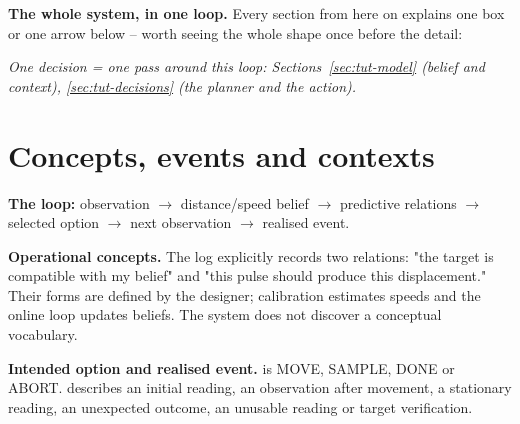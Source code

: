 \documentclass[11pt,a4paper]{article}
\newcommand{\code}[1]{\texttt{\detokenize{#1}}}
\begin{document}
\textbf{The whole system, in one loop.} Every section from here on explains one box or one arrow below -- worth seeing the whole shape once before the detail:
\begin{center}
\end{center}
\textit{\small One decision = one pass around this loop: Sections~\ref{sec:tut-model} (belief and context), \ref{sec:tut-decisions} (the planner and the action).}

\section{Concepts, events and contexts}
\textbf{The loop:} observation $\to$ distance/speed belief $\to$ predictive relations $\to$ selected option $\to$ next observation $\to$ realised event.

\textbf{Operational concepts.} The log explicitly records two relations: "the target is compatible with my belief" and "this pulse should produce this displacement." Their forms are defined by the designer; calibration estimates speeds and the online loop updates beliefs. The system does not discover a conceptual vocabulary.

\textbf{Intended option and realised event.} \code{intended_option} is MOVE, SAMPLE, DONE or ABORT. \code{realised_event} describes an initial reading, an observation after movement, a stationary reading, an unexpected outcome, an unusable reading or target verification.
\end{document}
